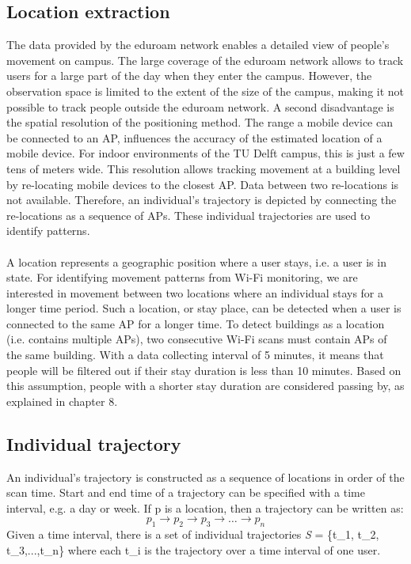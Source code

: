 \subsection{Location extraction}
The data provided by the eduroam network enables a detailed view of people’s movement on campus. The large coverage of the eduroam network allows to track users for a large part of the day when they enter the campus. However, the observation space is limited to the extent of the size of the campus, making it not possible to track people outside the eduroam network. A second disadvantage is the spatial resolution of the positioning method. The range a mobile device can be connected to an AP,  influences the accuracy of the estimated location of a mobile device. For indoor environments of the TU Delft campus, this is just a few tens of meters wide. This resolution allows tracking movement at a building level by re-locating mobile devices to the closest AP. Data between two re-locations is not available. Therefore, an individual’s trajectory is depicted by connecting the re-locations as a sequence of APs. These individual trajectories are used to identify patterns. \\\\
A location represents a geographic position where a user stays, i.e. a user is in state. For identifying movement patterns from Wi-Fi monitoring, we are interested in movement between two locations where an individual stays for a longer time period. Such a location, or stay place, can be detected when a user is connected to the same AP for a longer time. To detect  buildings as a location (i.e. contains multiple APs), two consecutive Wi-Fi scans must contain  APs of the same building. With a data collecting interval of 5 minutes, it means that people will be filtered out if their stay duration is less than 10 minutes. Based on this assumption, people with a shorter stay duration are considered passing by, as explained in chapter 8.

\subsection{Individual trajectory}
An individual’s trajectory is constructed as a sequence of locations in order of the scan time. Start and end time of a trajectory can be specified with a time interval, e.g. a day or week. If p is a location, then a trajectory can be written as:
$$p_{1} \rightarrow p_{2} \rightarrow p_{3} \rightarrow …\rightarrow p_{n}$$
Given a time interval, there is a set of individual trajectories \textit{S} = \{t_{1}, t_{2}, t_{3},...,t_{n}\} where each t_{i} is the trajectory over a time interval of one user. 

